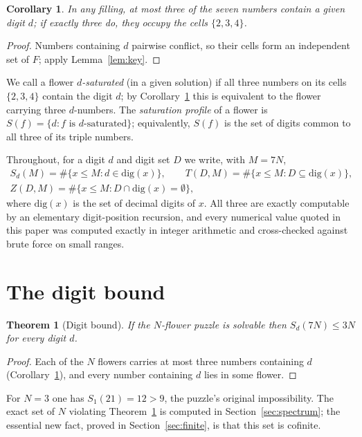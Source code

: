 \documentclass[11pt]{article}
\newtheorem{theorem}{Theorem}
\newtheorem{corollary}{Corollary}
\theoremstyle{definition}
\theoremstyle{remark}
\newcommand{\Sd}[2]{S_{#1}(#2)}
\begin{document}
\begin{corollary}\label{cor:three}
In any filling, at most three of the seven numbers contain a given digit $d$; if exactly three do, they occupy the cells $\{2,3,4\}$.
\end{corollary}

\begin{proof}
Numbers containing $d$ pairwise conflict, so their cells form an independent set of $F$; apply Lemma~\ref{lem:key}.
\end{proof}

We call a flower \emph{$d$-saturated} (in a given solution) if all three numbers on its cells $\{2,3,4\}$ contain the digit $d$; by Corollary~\ref{cor:three} this is equivalent to the flower carrying three $d$-numbers. The \emph{saturation profile} of a flower is $S(f)=\{d: f \text{ is } d\text{-saturated}\}$; equivalently, $S(f)$ is the set of digits common to all three of its triple numbers.

Throughout, for a digit $d$ and digit set $D$ we write, with $M=7N$,
\begin{gather*}
\Sd{d}{M} = \#\{x\le M: d \in \mathrm{dig}(x)\},\qquad
T(D,M) = \#\{x\le M: D\subseteq \mathrm{dig}(x)\},\\
Z(D,M) = \#\{x\le M: D\cap \mathrm{dig}(x)=\emptyset\},
\end{gather*}
where $\mathrm{dig}(x)$ is the set of decimal digits of $x$. All three are exactly computable by an elementary digit-position recursion, and every numerical value quoted in this paper was computed exactly in integer arithmetic and cross-checked against brute force on small ranges.

\section{The digit bound}\label{sec:digit}

\begin{theorem}[Digit bound]\label{thm:digit}
If the $N$-flower puzzle is solvable then $\Sd{d}{7N}\le 3N$ for every digit $d$.
\end{theorem}

\begin{proof}
Each of the $N$ flowers carries at most three numbers containing $d$ (Corollary~\ref{cor:three}), and every number containing $d$ lies in some flower.
\end{proof}

For $N=3$ one has $\Sd{1}{21}=12>9$, the puzzle's original impossibility. The exact set of $N$ violating Theorem~\ref{thm:digit} is computed in Section~\ref{sec:spectrum}; the essential new fact, proved in Section~\ref{sec:finite}, is that this set is cofinite.
\end{document}
